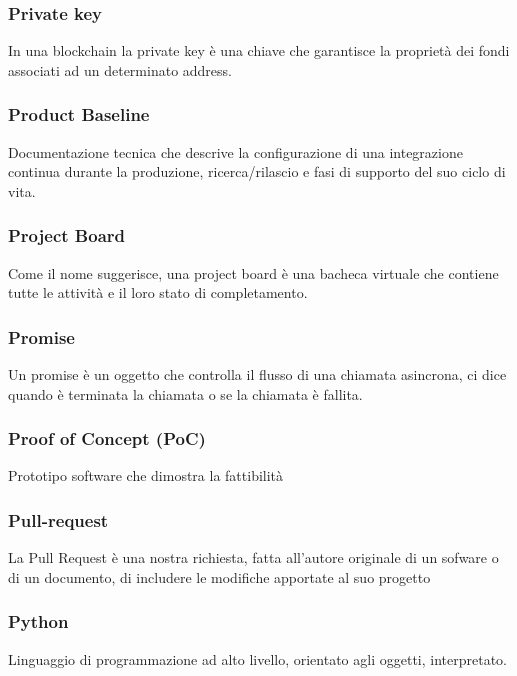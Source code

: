 \subsubsection*{Private key}
In una blockchain la private key è una chiave che garantisce la proprietà dei fondi associati ad un determinato address.
\subsubsection*{Product Baseline}
Documentazione tecnica che descrive la configurazione di una integrazione continua durante la produzione, ricerca/rilascio e fasi di supporto del suo ciclo di vita.
\subsubsection*{Project Board}
Come il nome suggerisce, una project board è una bacheca virtuale che contiene tutte le attività e il loro stato di completamento.
\subsubsection*{Promise}
Un promise è un oggetto che controlla il flusso di una chiamata asincrona, ci dice quando è terminata la chiamata o se la chiamata è fallita.
\subsubsection*{Proof of Concept (PoC)}
Prototipo software che dimostra la fattibilità 
\subsubsection*{Pull-request}
La Pull Request è una nostra richiesta, fatta all’autore originale di un sofware o di un documento, di includere le modifiche apportate al suo progetto
\subsubsection*{Python}
Linguaggio di programmazione ad alto livello, orientato agli oggetti, interpretato.
